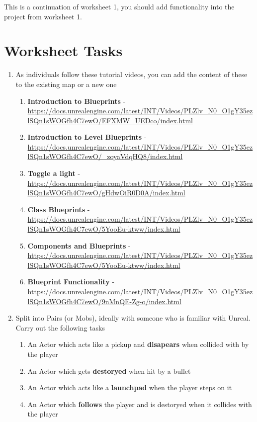 \documentclass{../../../fal_assignment}
\begin{document}
This is a continuation of worksheet 1, you should add functionality into the project from worksheet 1.

\section*{Worksheet Tasks}

\begin{enumerate}
	\item As individuals follow these tutorial videos, you can add the content of these to the existing map or a new one
  	\begin{enumerate}[label=(\Alph*)]
      \item \textbf{Introduction to Blueprints} - \url{https://docs.unrealengine.com/latest/INT/Videos/PLZlv_N0_O1gY35ezlSQn1sWOGfh4C7ewO/EFXMW_UEDco/index.html}
      \item \textbf{Introduction to Level Blueprints} - \url{https://docs.unrealengine.com/latest/INT/Videos/PLZlv_N0_O1gY35ezlSQn1sWOGfh4C7ewO/_zoyaVdqHQ8/index.html}
      \item \textbf{Toggle a light} - \url{https://docs.unrealengine.com/latest/INT/Videos/PLZlv_N0_O1gY35ezlSQn1sWOGfh4C7ewO/gHdwOiR0D0A/index.html}
      \item \textbf{Class Blueprints} - \url{https://docs.unrealengine.com/latest/INT/Videos/PLZlv_N0_O1gY35ezlSQn1sWOGfh4C7ewO/5YooEu-ktww/index.html}
      \item \textbf{Components and Blueprints} - \url{https://docs.unrealengine.com/latest/INT/Videos/PLZlv_N0_O1gY35ezlSQn1sWOGfh4C7ewO/5YooEu-ktww/index.html}
      \item \textbf{Blueprint Functionality} - \url{https://docs.unrealengine.com/latest/INT/Videos/PLZlv_N0_O1gY35ezlSQn1sWOGfh4C7ewO/9nMnQE-Zg-o/index.html}
    \end{enumerate}
\item Split into Pairs (or Mobs), ideally with someone who is familiar with Unreal. Carry out the following tasks
		\begin{enumerate}[label=(\Alph*)]
		\item An Actor which acts like a pickup and \textbf{disapears} when collided with by the player
		\item An Actor which gets \textbf{destoryed} when hit by a bullet
    \item An Actor which acts like a \textbf{launchpad} when the player steps on it
    \item An Actor which \textbf{follows} the player and is destoryed when it collides with the player
		\end{enumerate}
\end{enumerate}
\end{document}
